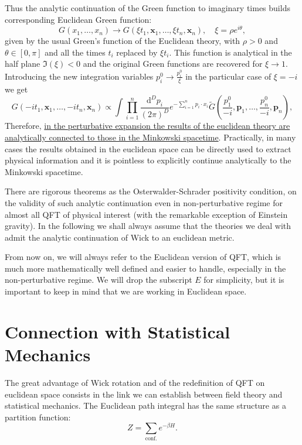 Thus the analytic continuation of the Green function to imaginary times builds corresponding Euclidean Green function:
\[
    G(x_1, \dots, x_n) \to G(\xi t_1, \mathbf{x}_1, \dots, \xi t_n, \mathbf{x}_n), \quad \xi = \rho e^{i \theta},
\]
given by the usual Green's function of the Euclidean theory, with \(\rho > 0\) and \(\theta \in [0, \pi]\) and all the times \(t_i\) replaced by \(\xi t_i\). This function is analytical in the half plane \(\Im(\xi) < 0\) and the original Green functions are recovered for \(\xi \to 1\). Introducing the new integration variables \(p^0_i \to \tfrac{p^0_i}{\xi}\) in the particular case of \(\xi = -i\) we get
\[
    G(-i t_1, \mathbf{x}_1, \dots, -i t_n, \mathbf{x}_n) \propto \int \prod_{i=1}^n \frac{\mathrm{d}^D p_i}{(2 \pi)^D} e^{- \sum_{i=1}^n p_i \cdot x_i} \tilde{G}(\frac{p_1^0}{-i},\mathbf{p}_1, \dots,\frac{p_n^0}{-i},\mathbf{p}_n),
\]
Therefore, \uline{in the perturbative expansion the results of the euclidean theory are analytically connected to those in the Minkowski spacetime}. Practically, in many cases the results obtained in the euclidean space can be directly used to extract physical information and it is pointless to explicitly continue analytically to the Minkowski spacetime.

There are rigorous theorems as the Osterwalder-Schrader positivity condition, on the validity of such analytic continuation even in non-perturbative regime for almost all QFT of physical interest (with the remarkable exception of Einstein gravity). In the following we shall always assume that the theories we deal with admit the analytic continuation of Wick to an euclidean metric.

From now on, we will always refer to the Euclidean version of QFT, which is much more mathematically well defined and easier to handle, especially in the non-perturbative regime. We will drop the subscript \(E\) for simplicity, but it is important to keep in mind that we are working in Euclidean space.

\section{Connection with Statistical Mechanics}

The great advantage of Wick rotation and of the redefinition of QFT on euclidean space consists in the link we can establish between field theory and statistical mechanics.
The Euclidean path integral has the same structure as a partition function:
\[
    Z = \sum_{\text{conf.}} e^{-\beta H}.
\]

